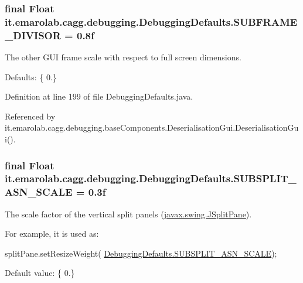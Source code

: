 \hypertarget{classit_1_1emarolab_1_1cagg_1_1debugging_1_1DebuggingDefaults_a997074e0a71f9a7b3d1e994a71930cc4}{
\subsubsection[{S\-U\-B\-F\-R\-A\-M\-E\-\_\-\-D\-I\-V\-I\-S\-O\-R}]{\setlength{\rightskip}{0pt plus 5cm}final Float it.\-emarolab.\-cagg.\-debugging.\-Debugging\-Defaults.\-S\-U\-B\-F\-R\-A\-M\-E\-\_\-\-D\-I\-V\-I\-S\-O\-R = 0.\-8f\hspace{0.3cm}{\ttfamily [static]}}}\label{classit_1_1emarolab_1_1cagg_1_1debugging_1_1DebuggingDefaults_a997074e0a71f9a7b3d1e994a71930cc4}
The other G\-U\-I frame scale with respect to full screen dimensions.\par
 Defaults\-: \{ 0.\} 

Definition at line 199 of file Debugging\-Defaults.\-java.



Referenced by it.\-emarolab.\-cagg.\-debugging.\-base\-Components.\-Deserialisation\-Gui.\-Deserialisation\-Gui().

\hypertarget{classit_1_1emarolab_1_1cagg_1_1debugging_1_1DebuggingDefaults_adf7088c65243e935301c9a31f4dfe2b4}{
\subsubsection[{S\-U\-B\-S\-P\-L\-I\-T\-\_\-\-A\-S\-N\-\_\-\-S\-C\-A\-L\-E}]{\setlength{\rightskip}{0pt plus 5cm}final Float it.\-emarolab.\-cagg.\-debugging.\-Debugging\-Defaults.\-S\-U\-B\-S\-P\-L\-I\-T\-\_\-\-A\-S\-N\-\_\-\-S\-C\-A\-L\-E = 0.\-3f\hspace{0.3cm}{\ttfamily [static]}}}\label{classit_1_1emarolab_1_1cagg_1_1debugging_1_1DebuggingDefaults_adf7088c65243e935301c9a31f4dfe2b4}
The scale factor of the vertical split panels (\hyperlink{}{javax.\-swing.\-J\-Split\-Pane}).\par
 For example, it is used as\-:
\begin{DoxyCode}
splitPane.setResizeWeight( \hyperlink{classit_1_1emarolab_1_1cagg_1_1debugging_1_1DebuggingDefaults_adf7088c65243e935301c9a31f4dfe2b4}{DebuggingDefaults.SUBSPLIT\_ASN\_SCALE}); 
\end{DoxyCode}
 \par
 Default value\-: \{ 0.\} 

